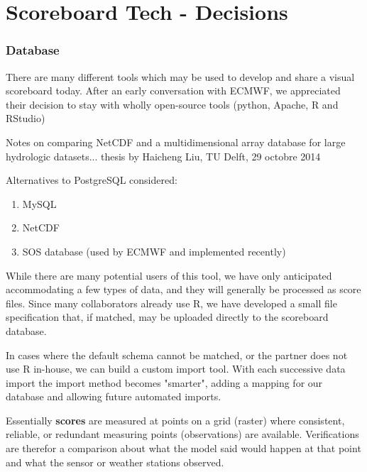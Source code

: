 \documentclass[logos,parttoc,morelanguage=french,morelanguage=italian]{orsay-memoire}
\begin{document}
\part{Scoreboard Tech - Decisions}

\section{Database}

There are many different tools which may be used to develop and share a visual scoreboard today. After an early conversation with ECMWF, we appreciated their decision to stay with wholly open-source tools (python, Apache, R and RStudio)

Notes on comparing NetCDF and a multidimensional array database for large hydrologic datasets...
thesis by Haicheng Liu, TU Delft, 29 octobre 2014

Alternatives to PostgreSQL considered:
\begin{enumerate}
\item MySQL
\item NetCDF
\item SOS database (used by ECMWF and implemented recently)
\end{enumerate}

While there are many potential users of this tool, we have only anticipated accommodating a few types of data, and they will generally be processed as score files. Since many collaborators already use R, we have developed a small file specification that, if matched, may be uploaded directly to the scoreboard database.

In cases where the default schema cannot be matched, or the partner does not use R in-house, we can build a custom import tool. With each successive data import the import method becomes "smarter", adding a mapping for our database and allowing future automated imports.

Essentially \textbf{scores} are measured at points on a grid (raster) where consistent, reliable, or redundant measuring points (observations) are available. Verifications are therefor a comparison about what the model said would happen at that point and what the sensor or weather stations observed.
\end{document}

